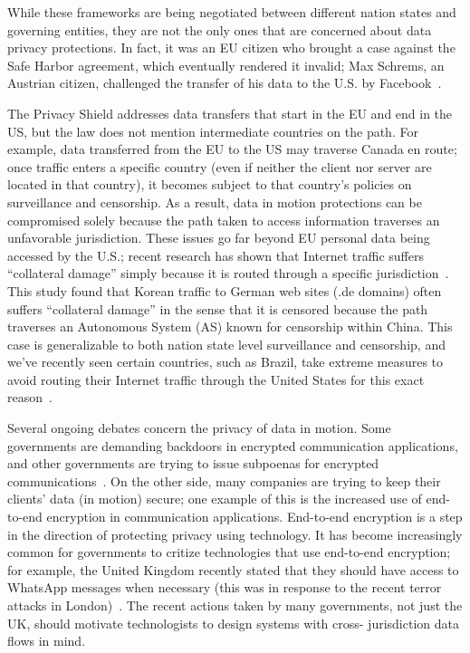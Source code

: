 While these frameworks are being negotiated between different nation states
and governing entities, they are not the only ones that are concerned about
data privacy protections.  In fact, it was an EU citizen who brought a case
against the Safe Harbor agreement, which eventually rendered it invalid; Max
Schrems, an Austrian citizen, challenged the transfer of his data to the U.S.
by Facebook~\cite{schrems}.

The Privacy Shield addresses data transfers that start in the EU and end in
the US, but the law does not mention intermediate countries on the path.  For
example, data transferred from the EU to the US may traverse Canada en route;
once traffic enters a specific country (even if neither the client nor server
are located in that country), it becomes subject to that country's policies on
surveillance and censorship.  As a result, data in motion protections can be
compromised solely because the path taken to access information traverses an
unfavorable jurisdiction.    These issues go far beyond EU personal data being
accessed by the U.S.; recent research has shown that Internet traffic suffers
``collateral damage'' simply because it is routed through a specific
jurisdiction~\cite{levis2012collateral}.  This study found that Korean traffic
to German web sites (.de domains) often suffers ``collateral damage'' in the
sense that it is censored because the path traverses an Autonomous System (AS)
known for censorship within China.  This case is generalizable to both nation
state level surveillance and censorship, and we've recently seen certain
countries, such as Brazil, take extreme measures to avoid routing their
Internet traffic through the United States for this exact
reason~\cite{brazil}.

Several ongoing debates concern the privacy of data in motion.  Some
governments are demanding backdoors in encrypted communication applications,
and other governments are trying to issue subpoenas for encrypted
communications~\cite{whatsapp_uk,signal_fbi}.  On the other side, many
companies are trying to keep their clients' data (in motion) secure; one
example of this is the increased use of end-to-end encryption in communication
applications.  End-to-end encryption is a step in the direction of protecting
privacy using technology.  It has become increasingly common for governments
to critize technologies that use end-to-end encryption; for example, the
United Kingdom recently stated that they should have access to WhatsApp
messages when necessary (this was in response to the recent terror attacks in
London)~\cite{uk_whatsapp}.  The recent actions taken by many governments, not
just the UK, should motivate technologists to design systems with cross-
jurisdiction data flows in mind.

